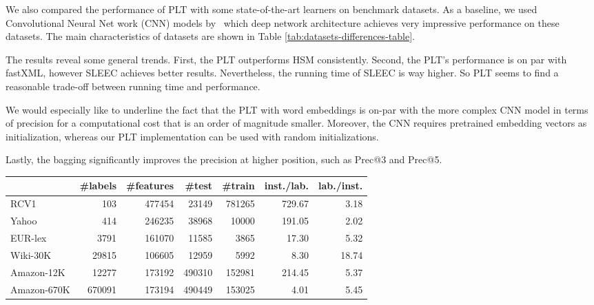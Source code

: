 \documentclass{article}
\newcommand{\Algo}[1]{\textsc{#1}}
\begin{document}
{We also compared the performance of \Algo{PLT} with some state-of-the-art learners on benchmark datasets. As a baseline, we used Convolutional Neural Net work (CNN) models by~\citep{Liu_et_al_2017} which deep network architecture achieves very impressive  performance on these datasets. The main characteristics of datasets are shown in Table \ref{tab:datasets-differences-table}. 

The results reveal some general trends. First, the \Algo{PLT} outperforms \Algo{HSM} consistently. Second, the \Algo{PLT}'s performance is on par with fastXML, however SLEEC  achieves better results. Nevertheless, the running time of SLEEC is way higher. So PLT seems to find a reasonable trade-off between running time and performance.

We would especially like to underline the fact that the PLT with word embeddings is on-par with the more complex CNN model in terms of precision for a computational cost that is an order of magnitude smaller. Moreover, the CNN requires pretrained embedding vectors as initialization, whereas our \Algo{PLT} implementation can be used with random initializations.


Lastly, the bagging significantly improves the precision at higher position, such as Prec@3 and Prec@5. 



\begin{table*}[t!]
\vspace{-.2cm}
        \caption{Main characteristics of the datasets used in the experiment.}
        \label{tab:datasets-differences-table}
        \begin{center}
                \begin{small}
                        \begin{tabular}{l@{\hskip 4pt} | r@{\hskip 4pt} r@{\hskip 4pt} r@{\hskip 4pt} r@{\hskip 4pt} r@{\hskip 4pt} r@{\hskip 4pt} }
                                \toprule
& \#labels &\#features &\#test &\#train & inst./lab. & lab./inst.  \\ \midrule
RCV1 & 103 & 477454 & 23149 & 781265 & 729.67 & 3.18 \\
Yahoo & 414 & 246235 & 38968 & 10000 & 191.05 & 2.02 \\
EUR-lex & 3791 & 161070 & 11585 & 3865 & 17.30 & 5.32 \\
Wiki-30K & 29815 & 106605 & 12959 & 5992 & 8.30 & 18.74 \\
Amazon-12K & 12277 & 173192 & 490310 & 152981 & 214.45 & 5.37 \\
Amazon-670K & 670091 & 173194 & 490449 & 153025 & 4.01 & 5.45 \\
                                \bottomrule
                        \end{tabular}
                \end{small}
        \end{center}
                        \vspace{-0.4cm}
\end{table*}


}
\end{document}
